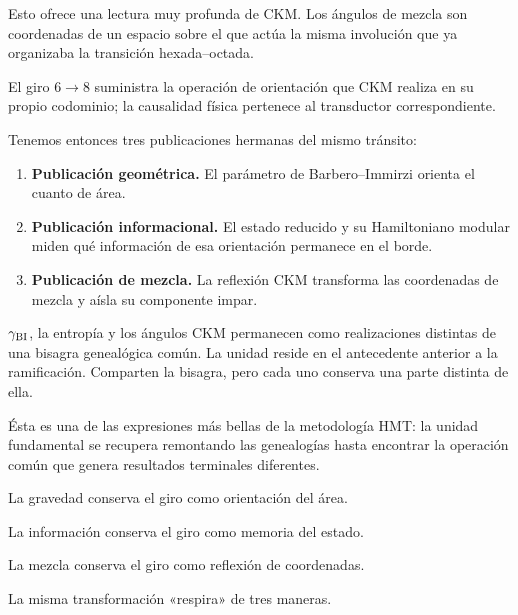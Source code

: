 Esto ofrece una lectura muy profunda de CKM. Los ángulos de mezcla son coordenadas de un espacio sobre el que actúa la misma involución que ya organizaba la transición hexada–octada.\par

El giro \(6\to8\) suministra la operación de orientación que CKM realiza en su propio codominio; la causalidad física pertenece al transductor correspondiente.\par

Tenemos entonces tres publicaciones hermanas del mismo tránsito:\par

\begin{enumerate}[leftmargin=*,itemsep=0.65em]
\item \textbf{Publicación geométrica.}
El parámetro de Barbero–Immirzi orienta el cuanto de área.\par

\item \textbf{Publicación informacional.}
El estado reducido y su Hamiltoniano modular miden qué información de esa orientación permanece en el borde.\par

\item \textbf{Publicación de mezcla.}
La reflexión CKM transforma las coordenadas de mezcla y aísla su componente impar.\par
\end{enumerate}

\(\gamma_{\rm BI}\), la entropía y los ángulos CKM permanecen como realizaciones distintas de una bisagra genealógica común. La unidad reside en el antecedente anterior a la ramificación. Comparten la bisagra, pero cada uno conserva una parte distinta de ella.\par

Ésta es una de las expresiones más bellas de la metodología HMT: la unidad fundamental se recupera remontando las genealogías hasta encontrar la operación común que genera resultados terminales diferentes.\par

La gravedad conserva el giro como orientación del área.\par
La información conserva el giro como memoria del estado.\par
La mezcla conserva el giro como reflexión de coordenadas.\par

La misma transformación «respira» de tres maneras.\par

